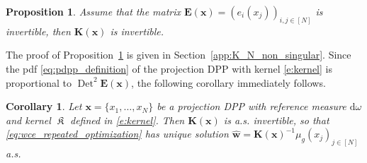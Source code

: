 \documentclass[twoside,11pt]{book}
\newtheorem{corollary}{Corollary}
\newtheorem{proposition}{Proposition}
\numberwithin{theorem}{chapter}
\numberwithin{definition}{chapter}
\numberwithin{proposition}{chapter}
\numberwithin{corollary}{chapter}
\numberwithin{example}{chapter}
\numberwithin{lemma}{chapter}
\DeclareMathOperator{\Det}{Det}
\DeclareMathOperator{\Span}{\mathrm{Span}}
\DeclareMathOperator{\Tran}{\intercal}
\DeclareMathOperator*{\KDPP}{\mathfrak{K}}
\begin{document}
\begin{proposition}\label{prop:K_N_non_singular}
Assume that the matrix
$\bm{E}(\bm{x}) = (e_{i}(x_{j}))_{ i,j \in [N]}$ is invertible, then $\bm{K}(\bm{x})$ is invertible.
\end{proposition}
The proof of Proposition~\ref{prop:K_N_non_singular} is given in Section~\ref{app:K_N_non_singular}.
Since the pdf \eqref{eq:pdpp_definition} of the projection DPP with kernel \eqref{e:kernel} is proportional to $\Det^2\bm{E}(\bm{x})$, the following corollary immediately follows.


\begin{corollary}
  Let $\bm{x} = \{x_{1}, \dots , x_{N}\}$ be a projection DPP with reference measure $\mathrm{d}\omega$ and kernel $\KDPP$ defined in \eqref{e:kernel}. Then $\bm{K}(\bm{x})$ is a.s. invertible, so that \eqref{eq:wce_repeated_optimization} has unique solution $\hat{\bm{w}} = \bm{K}(\bm{x})^{-1}\mu_{g}(x_{j})_{j \in [N]}$ a.s.
\label{c:regularization}
\end{corollary}



\end{document}
